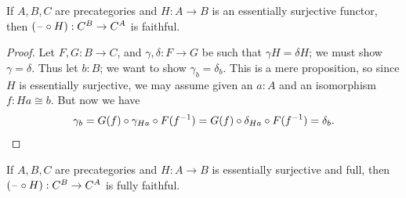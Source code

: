 \begin{lem}\label{ct:esosurj-postcomp-faithful}
  If $A,B,C$ are precategories and $H:A\to B$ is an essentially surjective functor, then $(\mathord{\hspace{1pt}\text{--}\hspace{1pt}}\circ H):C^B \to C^A$ is faithful.
\end{lem}
\begin{proof}
  Let $F,G:B\to C$, and $\gamma,\delta:F\to G$ be such that $\gamma H = \delta H$; we must show $\gamma=\delta$.
  Thus let $b:B$; we want to show $\gamma_b=\delta_b$.
  This is a mere proposition, so since $H$ is essentially surjective, we may assume given an $a:A$ and an isomorphism $f:Ha\cong b$.
  But now we have
  \[ \gamma_b = G(f) \circ \gamma_{Ha} \circ F({f}^{-1})
  = G(f) \circ \delta_{Ha} \circ F({f}^{-1})
  = \delta_b.\qedhere
  \]
\end{proof}

\begin{lem}\label{ct:esofull-precomp-ff}
  If $A,B,C$ are precategories and $H:A\to B$ is essentially surjective and full, then $(\mathord{\hspace{1pt}\text{--}\hspace{1pt}}\circ H):C^B \to C^A$ is fully faithful.
\end{lem}
